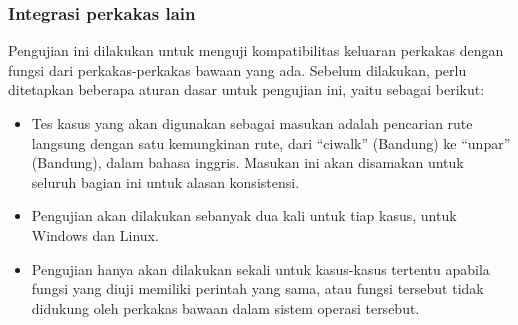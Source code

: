 \subsubsection{Integrasi perkakas \cl lain}
\label{sec:testing-experiments-testing-integration}

Pengujian ini dilakukan untuk menguji kompatibilitas keluaran perkakas dengan fungsi dari perkakas-perkakas \cl bawaan yang ada. Sebelum dilakukan, perlu ditetapkan beberapa aturan dasar untuk pengujian ini, yaitu sebagai berikut:

\begin{itemize}
	\item Tes kasus yang akan digunakan sebagai masukan adalah pencarian rute langsung dengan satu kemungkinan rute, dari ``ciwalk'' (Bandung) ke ``unpar'' (Bandung), dalam bahasa inggris. Masukan ini akan disamakan untuk seluruh bagian ini untuk alasan konsistensi.
	\item Pengujian akan dilakukan sebanyak dua kali untuk tiap kasus, untuk Windows dan Linux.
	\item Pengujian hanya akan dilakukan sekali untuk kasus-kasus tertentu apabila fungsi yang diuji memiliki perintah yang sama, atau fungsi tersebut tidak didukung oleh perkakas \cl bawaan dalam sistem operasi tersebut.
\end{itemize}

